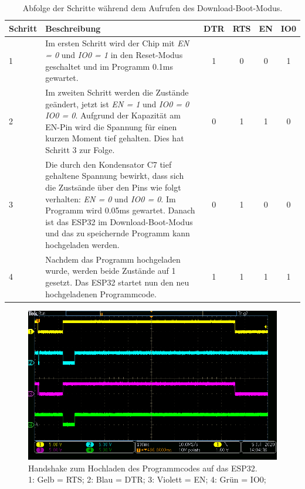 \begin{table}[H]
\center
\begin{tabularx}{\textwidth}{|l|X||c|c||c|c|}
\hline
Schritt & Beschreibung & DTR & RTS & EN & IO0\\
\hline
1 & Im ersten Schritt wird der Chip mit \textit{EN = 0} und \textit{IO0 = 1} in den Reset-Modus geschaltet und im Programm 0.1ms gewartet. & 1 & 0 & 0 & 1 \\
\hline
2 & Im zweiten Schritt werden die Zustände geändert, jetzt ist \textit{EN = 1} und \textit{IO0 = 0} \textit{IO0 = 0}. Aufgrund der Kapazität am EN-Pin wird die Spannung für einen kurzen Moment tief gehalten. Dies hat Schritt 3 zur Folge. & 0 & 1 & 1 & 0 \\
\hline
3 & Die durch den Kondensator C7 tief gehaltene Spannung bewirkt, dass sich die Zustsände über den Pins wie folgt verhalten: \textit{EN = 0} und \textit{IO0 = 0}. Im Programm wird 0.05ms gewartet. Danach ist das ESP32 im Download-Boot-Modus und das zu speichernde Programm kann hochgeladen werden. & 0 & 1 & 0 & 0 \\
\hline
4 & Nachdem das Programm hochgeladen wurde, werden beide Zustände auf 1 gesetzt. Das ESP32 startet nun den neu hochgeladenen Programmcode. & 1 & 1 & 1 & 1 \\
\hline
\end{tabularx}
\caption{Abfolge der Schritte während dem Aufrufen des Download-Boot-Modus.}
\label{tab:Abfolge_Download_Boot_Modus}
\end{table}

\newpage

\begin{figure}[H]
\center
\includegraphics[width = \textwidth]{graphics/ESP32_RTS_DTR_EN_IO0_gesamt}
\caption{Handshake zum Hochladen des Programmcodes auf das ESP32. \\\hspace{\textwidth}1: Gelb = RTS; 2: Blau = DTR; 3: Violett = EN; 4: Grün = IO0;}
\label{fig:ESP32_RTS_DTR_EN_IO0_gesamt}
\end{figure}

